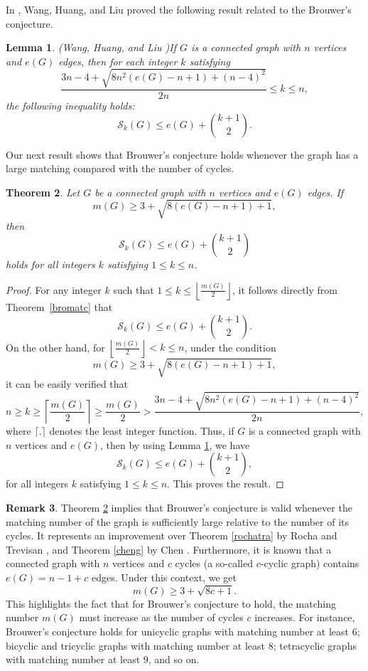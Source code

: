 \documentclass[12pt]{article}
\theoremstyle{plain}
\newtheorem{theorem}{Theorem}[section]
\newtheorem{lemma}[theorem]{Lemma}
\theoremstyle{definition}
\newtheorem{remark}[theorem]{Remark}
\begin{document}
In \cite{Wang2012}, Wang, Huang, and Liu proved the following result related to the Brouwer's conjecture.
\begin{lemma} {\rm (Wang, Huang, and Liu \cite{Wang2012})}\label{wangk}
If $G$ is a connected graph with $n$ vertices and $e(G)$ edges, then for each integer $k$ satisfying $$\frac{3n-4+\sqrt{8n^2(e(G)-n+1)+(n-4)^2}}{2n}\leq k\leq n,$$ the following inequality holds:
$$\mathcal{S}_k(G)\leq e(G)+\binom{k+1}{2}.$$	
\end{lemma}
Our next result shows that Brouwer's conjecture holds whenever the graph has a large matching compared with the number of cycles. 

\begin{theorem} \label{angtah}
Let $G$ be a connected graph with $n$ vertices and $e(G)$ edges. If
$$m(G)\geq 3+\sqrt{8(e(G)-n+1)+1},$$
then $$\mathcal{S}_k(G)\leq e(G)+\binom{k+1}{2}$$ holds for all integers $k$
satisfying $1\leq k\leq n$. 
\end{theorem}
\begin{proof}
For any integer $k$ such that $1 \leq k \leq \left\lfloor \frac{m(G)}{2} \right\rfloor$, it follows directly from Theorem~\ref{bromatc} that
$$\mathcal{S}_k(G) \leq e(G) + \binom{k+1}{2}.$$
On the other hand, for $\left\lfloor \frac{m(G)}{2} \right\rfloor < k \leq n$, under the condition
$$m(G) \geq 3 + \sqrt{8(e(G) - n + 1) + 1},$$
it can be easily verified that
$$n \geq k \geq \left\lceil \frac{m(G)}{2} \right\rceil \geq \frac{m(G)}{2} > \frac{3n - 4 + \sqrt{8n^2(e(G) - n + 1) + (n - 4)^2}}{2n},$$ where $ \lceil . \rceil$ denotes the least integer function.
Thus, if $G$ is a connected graph with $n$ vertices and $e(G)$, then by using Lemma \ref{wangk}, we have
$$\mathcal{S}_k(G)\leq e(G)+\binom{k+1}{2},$$
for all integers $k$ satisfying $1\leq k\leq n$. This proves the result. 	
\end{proof}

\begin{remark}
Theorem \ref{angtah} implies that Brouwer's conjecture is valid whenever the matching number of the graph is sufficiently large relative to the number of its cycles. It represents an improvement over Theorem \ref{rochatra} by Rocha and Trevisan \cite{Rocha2014}, and Theorem \ref{cheng} by Chen \cite{Chen2018a}. Furthermore, it is known that a connected graph with $n$ vertices and $c$ cycles (a so-called {$c$-cyclic graph}) contains $e(G) = n - 1 + c$ edges. Under this context, we get $$m(G) \geq 3 + \sqrt{8c + 1}.$$
This highlights the fact that for Brouwer's conjecture to hold, the matching number $m(G)$ must increase as the number of cycles $c$ increases. For instance, Brouwer’s conjecture holds for unicyclic graphs with matching number at least $6$; bicyclic and tricyclic graphs with matching number at least $8$; tetracyclic graphs with matching number at least $9$, and so on. 	
\end{remark} 
\end{document}
